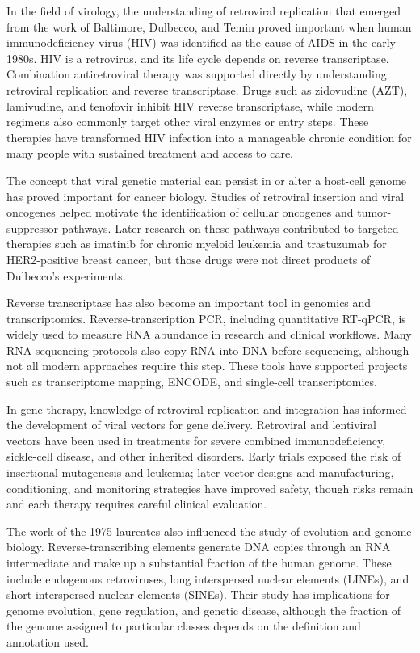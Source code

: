 In the field of virology, the understanding of retroviral replication that emerged from the work of Baltimore, Dulbecco, and Temin proved important when human immunodeficiency virus (HIV) was identified as the cause of AIDS in the early 1980s. HIV is a retrovirus, and its life cycle depends on reverse transcriptase. Combination antiretroviral therapy was supported directly by understanding retroviral replication and reverse transcriptase. Drugs such as zidovudine (AZT), lamivudine, and tenofovir inhibit HIV reverse transcriptase, while modern regimens also commonly target other viral enzymes or entry steps. These therapies have transformed HIV infection into a manageable chronic condition for many people with sustained treatment and access to care.

The concept that viral genetic material can persist in or alter a host-cell genome has proved important for cancer biology. Studies of retroviral insertion and viral oncogenes helped motivate the identification of cellular oncogenes and tumor-suppressor pathways. Later research on these pathways contributed to targeted therapies such as imatinib for chronic myeloid leukemia and trastuzumab for HER2-positive breast cancer, but those drugs were not direct products of Dulbecco's experiments.

Reverse transcriptase has also become an important tool in genomics and transcriptomics. Reverse-transcription PCR, including quantitative RT-qPCR, is widely used to measure RNA abundance in research and clinical workflows. Many RNA-sequencing protocols also copy RNA into DNA before sequencing, although not all modern approaches require this step. These tools have supported projects such as transcriptome mapping, ENCODE, and single-cell transcriptomics.

In gene therapy, knowledge of retroviral replication and integration has informed the development of viral vectors for gene delivery. Retroviral and lentiviral vectors have been used in treatments for severe combined immunodeficiency, sickle-cell disease, and other inherited disorders. Early trials exposed the risk of insertional mutagenesis and leukemia; later vector designs and manufacturing, conditioning, and monitoring strategies have improved safety, though risks remain and each therapy requires careful clinical evaluation.

The work of the 1975 laureates also influenced the study of evolution and genome biology. Reverse-transcribing elements generate DNA copies through an RNA intermediate and make up a substantial fraction of the human genome. These include endogenous retroviruses, long interspersed nuclear elements (LINEs), and short interspersed nuclear elements (SINEs). Their study has implications for genome evolution, gene regulation, and genetic disease, although the fraction of the genome assigned to particular classes depends on the definition and annotation used.

